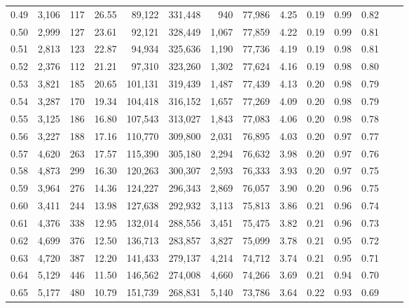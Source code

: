 \begin{tabular}{rrrrrrrrrrrrrr}
0.49 &   3,106 &    117 &    26.55 &   89,122 &  331,448 &     940 &  77,986 &  4.25 &  0.19 &  0.99 &      0.82 \\
0.50 &   2,999 &    127 &    23.61 &   92,121 &  328,449 &   1,067 &  77,859 &  4.22 &  0.19 &  0.99 &      0.81 \\
0.51 &   2,813 &    123 &    22.87 &   94,934 &  325,636 &   1,190 &  77,736 &  4.19 &  0.19 &  0.98 &      0.81 \\
0.52 &   2,376 &    112 &    21.21 &   97,310 &  323,260 &   1,302 &  77,624 &  4.16 &  0.19 &  0.98 &      0.80 \\
0.53 &   3,821 &    185 &    20.65 &  101,131 &  319,439 &   1,487 &  77,439 &  4.13 &  0.20 &  0.98 &      0.79 \\
0.54 &   3,287 &    170 &    19.34 &  104,418 &  316,152 &   1,657 &  77,269 &  4.09 &  0.20 &  0.98 &      0.79 \\
0.55 &   3,125 &    186 &    16.80 &  107,543 &  313,027 &   1,843 &  77,083 &  4.06 &  0.20 &  0.98 &      0.78 \\
0.56 &   3,227 &    188 &    17.16 &  110,770 &  309,800 &   2,031 &  76,895 &  4.03 &  0.20 &  0.97 &      0.77 \\
0.57 &   4,620 &    263 &    17.57 &  115,390 &  305,180 &   2,294 &  76,632 &  3.98 &  0.20 &  0.97 &      0.76 \\
0.58 &   4,873 &    299 &    16.30 &  120,263 &  300,307 &   2,593 &  76,333 &  3.93 &  0.20 &  0.97 &      0.75 \\
0.59 &   3,964 &    276 &    14.36 &  124,227 &  296,343 &   2,869 &  76,057 &  3.90 &  0.20 &  0.96 &      0.75 \\
0.60 &   3,411 &    244 &    13.98 &  127,638 &  292,932 &   3,113 &  75,813 &  3.86 &  0.21 &  0.96 &      0.74 \\
0.61 &   4,376 &    338 &    12.95 &  132,014 &  288,556 &   3,451 &  75,475 &  3.82 &  0.21 &  0.96 &      0.73 \\
0.62 &   4,699 &    376 &    12.50 &  136,713 &  283,857 &   3,827 &  75,099 &  3.78 &  0.21 &  0.95 &      0.72 \\
0.63 &   4,720 &    387 &    12.20 &  141,433 &  279,137 &   4,214 &  74,712 &  3.74 &  0.21 &  0.95 &      0.71 \\
0.64 &   5,129 &    446 &    11.50 &  146,562 &  274,008 &   4,660 &  74,266 &  3.69 &  0.21 &  0.94 &      0.70 \\
0.65 &   5,177 &    480 &    10.79 &  151,739 &  268,831 &   5,140 &  73,786 &  3.64 &  0.22 &  0.93 &      0.69 \\

\end{tabular}
